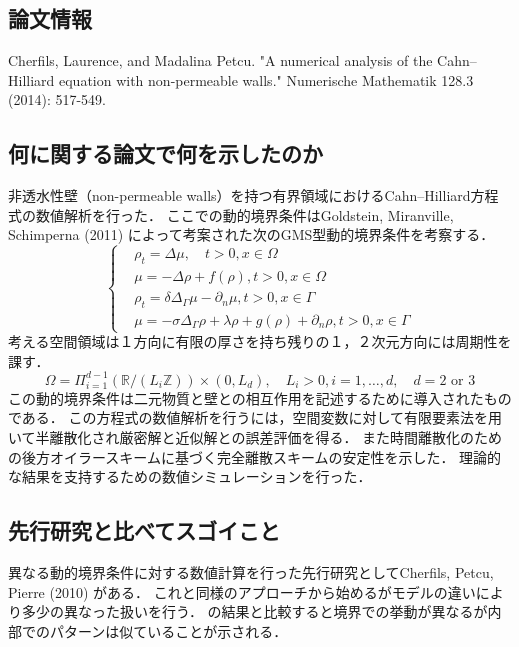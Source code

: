 \documentclass[openary, a4paper, oneside]{jsarticle}
\begin{document}
  \subsection{論文情報}
  Cherfils, Laurence, and Madalina Petcu. "A numerical analysis of the Cahn–Hilliard equation with non-permeable walls." Numerische Mathematik 128.3 (2014): 517-549.
  \subsection{何に関する論文で何を示したのか}
  非透水性壁（non-permeable walls）を持つ有界領域におけるCahn--Hilliard方程式の数値解析を行った．
  ここでの動的境界条件はGoldstein, Miranville, Schimperna (2011) \cite{GoldsteinMiranvilleSchimperna2011} によって考案された次のGMS型動的境界条件を考察する．
  \begin{equation}
    \left\{\begin{array}{llrl}
    &\rho_{t} =\Delta \mu, \quad t>0, x \in \Omega \\
    &\mu =-\Delta \rho+f(\rho), t>0, x \in \Omega \\
    &\rho_{t} =\delta \Delta_{\Gamma} \mu-\partial_{n} \mu, t>0, x \in \Gamma \\
    &\mu =-\sigma \Delta_{\Gamma} \rho+\lambda \rho+g(\rho)+\partial_{n} \rho, t>0, x \in \Gamma
    \end{array}\right.
  \end{equation}
  考える空間領域は１方向に有限の厚さを持ち残りの１，２次元方向には周期性を課す．
  \begin{equation}
    \Omega=\Pi_{i=1}^{d-1}\left(\mathbb{R} /\left(L_{i} \mathbb{Z}\right)\right) \times\left(0, L_{d}\right), \quad L_{i}>0, i=1, \ldots, d, \quad d=2 \text { or } 3
  \end{equation}
  この動的境界条件は二元物質と壁との相互作用を記述するために導入されたものである．
  この方程式の数値解析を行うには，空間変数に対して有限要素法を用いて半離散化され厳密解と近似解との誤差評価を得る．
  また時間離散化のための後方オイラースキームに基づく完全離散スキームの安定性を示した．
  理論的な結果を支持するための数値シミュレーションを行った．
  \subsection{先行研究と比べてスゴイこと}
  異なる動的境界条件に対する数値計算を行った先行研究としてCherfils, Petcu, Pierre (2010) \cite{CherfilsPetcuPierre2010}がある．
  これと同様のアプローチから始めるがモデルの違いにより多少の異なった扱いを行う．
  \cite{CherfilsPetcuPierre2010}の結果と比較すると境界での挙動が異なるが内部でのパターンは似ていることが示される．
\end{document}

